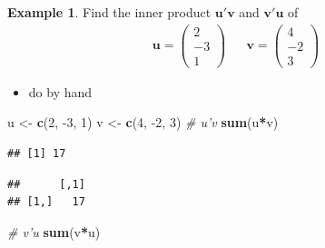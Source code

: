 \documentclass[
]{book}
\newenvironment{Shaded}{\begin{snugshade}}{\end{snugshade}}
\newcommand{\CommentTok}[1]{\textcolor[rgb]{0.56,0.35,0.01}{\textit{#1}}}
\newcommand{\DecValTok}[1]{\textcolor[rgb]{0.00,0.00,0.81}{#1}}
\newcommand{\KeywordTok}[1]{\textcolor[rgb]{0.13,0.29,0.53}{\textbf{#1}}}
\newcommand{\NormalTok}[1]{#1}
\newcommand{\OperatorTok}[1]{\textcolor[rgb]{0.81,0.36,0.00}{\textbf{#1}}}
\newcommand{\StringTok}[1]{\textcolor[rgb]{0.31,0.60,0.02}{#1}}
\providecommand{\tightlist}{%
  \setlength{\itemsep}{0pt}\setlength{\parskip}{0pt}}
\theoremstyle{definition}
\theoremstyle{definition}
\newtheorem{example}{Example}[chapter]
\theoremstyle{definition}
\theoremstyle{definition}
\theoremstyle{remark}
\begin{document}
\begin{example}

Find the inner product \(\mathbf{u}'\mathbf{v}\) and \(\mathbf{v}'\mathbf{u}\) of
\[
\begin{aligned}
\mathbf{u} = \begin{pmatrix} 2 \\ -3 \\ 1 \end{pmatrix} & & \mathbf{v} = \begin{pmatrix} 4 \\ -2 \\ 3 \end{pmatrix} 
\end{aligned}
\]

\begin{itemize}
\tightlist
\item
  do by hand
\end{itemize}

\begin{Shaded}
\begin{Highlighting}[]
\NormalTok{u <-}\StringTok{ }\KeywordTok{c}\NormalTok{(}\DecValTok{2}\NormalTok{, }\DecValTok{-3}\NormalTok{, }\DecValTok{1}\NormalTok{)}
\NormalTok{v <-}\StringTok{ }\KeywordTok{c}\NormalTok{(}\DecValTok{4}\NormalTok{, }\DecValTok{-2}\NormalTok{, }\DecValTok{3}\NormalTok{)}
\CommentTok{# u'v}
\KeywordTok{sum}\NormalTok{(u}\OperatorTok{*}\NormalTok{v)}
\end{Highlighting}
\end{Shaded}

\begin{verbatim}
## [1] 17
\end{verbatim}

\begin{Shaded}
\end{Shaded}

\begin{verbatim}
##      [,1]
## [1,]   17
\end{verbatim}

\begin{Shaded}
\begin{Highlighting}[]
\CommentTok{# v'u}
\KeywordTok{sum}\NormalTok{(v}\OperatorTok{*}\NormalTok{u)}
\end{Highlighting}
\end{Shaded}


\end{example}
\end{document}
